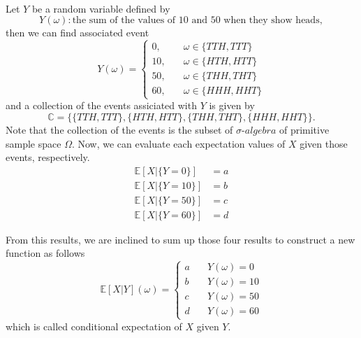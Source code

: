\documentclass[twoside]{article}
\makeatletter
\theoremstyle{definition}
\theoremstyle{remark}
\theoremstyle{remark}
\newenvironment{example}
 {\patchcmd{\@thm}{\trivlist}{\list{}{\leftmargin=3em \rightmargin=3em}}{}{}%
  \vspace*{10\p@}
  \innerexample\pushQED{\hfill\ensuremath{\Diamond}}}
 {\popQED\endinnerexample}
\makeatother
\begin{document}
\begin{example}{\bf (Continued from 4.5.1)} \\
  Let $Y$ be a random variable defined by
  \begin{equation*}
    Y(\omega): \textrm{the sum of the values of 10 and 50 when they show heads},
  \end{equation*}
  then we can find associated event
  \begin{equation*}
    Y(\omega) = \left\{
    \begin{array}{ll}
      0,  \quad & \omega \in \{TTH, TTT\} \\
      10, \quad & \omega \in \{HTH, HTT\} \\
      50, \quad & \omega \in \{THH, THT\} \\
      60, \quad & \omega \in \{HHH, HHT\}
    \end{array}
    \right.
  \end{equation*}
  and a collection of the events assiciated with $Y$ is given by
  \begin{equation*}
    \mathbb{C} = \{\{TTH, TTT\}, \{HTH, HTT\}, \{THH, THT\}, \{HHH, HHT\}\}.
  \end{equation*}
  Note that the collection of the events is the subset of $\sigma$-$algebra$ of
  primitive sample space $\Omega$. Now, we can evaluate each expectation values
  of $X$ given those events, respectively.
  \begin{equation*}
    \begin{split}
      \mathbb{E}[X | {\{Y =  0\}}] &= a \\
      \mathbb{E}[X | {\{Y = 10\}}] &= b \\
      \mathbb{E}[X | {\{Y = 50\}}] &= c \\
      \mathbb{E}[X | {\{Y = 60\}}] &= d
    \end{split}
  \end{equation*}

  From this results, we are inclined to sum up those four results to construct
  a new function as follows
  \begin{equation*}
    \mathbb{E}[X | Y] (\omega) = \left\{
    \begin{array}{ll}
      a \quad & Y(\omega) =  0 \\
      b \quad & Y(\omega) = 10 \\
      c \quad & Y(\omega) = 50 \\
      d \quad & Y(\omega) = 60
    \end{array}
    \right.
  \end{equation*}
  which is called conditional expectation of $X$ given $Y$.~\cite{ONLINE-2}
\end{example}
\end{document}
